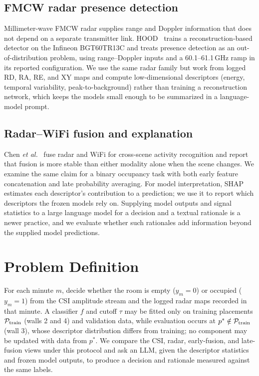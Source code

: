 \documentclass[conference,10pt,letterpaper]{IEEEtran}
\begin{document}
\subsection{FMCW radar presence detection}
Millimeter-wave FMCW radar supplies range and Doppler information that does not depend on a separate transmitter link. HOOD~\cite{hood} trains a reconstruction-based detector on the Infineon BGT60TR13C and treats presence detection as an out-of-distribution problem, using range--Doppler inputs and a 60.1--61.1\,GHz ramp in its reported configuration. We use the same radar family but work from logged RD, RA, RE, and XY maps and compute low-dimensional descriptors (energy, temporal variability, peak-to-background) rather than training a reconstruction network, which keeps the models small enough to be summarized in a language-model prompt.

\subsection{Radar--WiFi fusion and explanation}
Chen \emph{et al.}~\cite{fusion} fuse radar and WiFi for cross-scene activity recognition and report that fusion is more stable than either modality alone when the scene changes. We examine the same claim for a binary occupancy task with both early feature concatenation and late probability averaging. For model interpretation, SHAP~\cite{shap} estimates each descriptor's contribution to a prediction; we use it to report which descriptors the frozen models rely on. Supplying model outputs and signal statistics to a large language model for a decision and a textual rationale is a newer practice, and we evaluate whether such rationales add information beyond the supplied model predictions.

\section{Problem Definition}\label{sec:problem}
For each minute $m$, decide whether the room is empty ($y_m=0$) or occupied ($y_m=1$) from the CSI amplitude stream and the logged radar maps recorded in that minute. A classifier $f$ and cutoff $\tau$ may be fitted only on training placements $\mathcal{P}_{\rm train}$ (walls 2 and 4) and validation data, while evaluation occurs at $p^\ast\notin\mathcal{P}_{\rm train}$ (wall 3), whose descriptor distribution differs from training; no component may be updated with data from $p^\ast$. We compare the CSI, radar, early-fusion, and late-fusion views under this protocol and ask an LLM, given the descriptor statistics and frozen model outputs, to produce a decision and rationale measured against the same labels.
\end{document}
